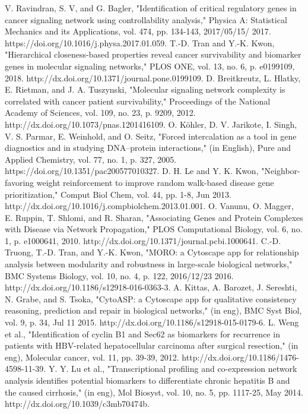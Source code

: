 \documentclass[5p,,preprint,12pt]{elsarticle}
\begin{document}
\begin{thebibliography}{71}
	V. Ravindran, S. V, and G. Bagler, "Identification of critical regulatory genes in cancer signaling network using controllability analysis," Physica A: Statistical Mechanics and its Applications, vol. 474, pp. 134-143, 2017/05/15/ 2017. https://doi.org/10.1016/j.physa.2017.01.059.
	T.-D. Tran and Y.-K. Kwon, "Hierarchical closeness-based properties reveal cancer survivability and biomarker genes in molecular signaling networks," PLOS ONE, vol. 13, no. 6, p. e0199109, 2018. http://dx.doi.org/10.1371/journal.pone.0199109.
	D. Breitkreutz, L. Hlatky, E. Rietman, and J. A. Tuszynski, "Molecular signaling network complexity is correlated with cancer patient survivability," Proceedings of the National Academy of Sciences, vol. 109, no. 23, p. 9209, 2012. http://dx.doi.org/10.1073/pnas.1201416109.
	O. Köhler, D. V. Jarikote, I. Singh, V. S. Parmar, E. Weinhold, and O. Seitz, "Forced intercalation as a tool in gene diagnostics and in studying DNA–protein interactions," (in English), Pure and Applied Chemistry, vol. 77, no. 1, p. 327, 2005.  https://doi.org/10.1351/pac200577010327.
	D. H. Le and Y. K. Kwon, "Neighbor-favoring weight reinforcement to improve random walk-based disease gene prioritization," Comput Biol Chem, vol. 44, pp. 1-8, Jun 2013. http://dx.doi.org/10.1016/j.compbiolchem.2013.01.001.
	O. Vanunu, O. Magger, E. Ruppin, T. Shlomi, and R. Sharan, "Associating Genes and Protein Complexes with Disease via Network Propagation," PLOS Computational Biology, vol. 6, no. 1, p. e1000641, 2010. http://dx.doi.org/10.1371/journal.pcbi.1000641.
	C.-D. Truong, T.-D. Tran, and Y.-K. Kwon, "MORO: a Cytoscape app for relationship analysis between modularity and robustness in large-scale biological networks," BMC Systems Biology, vol. 10, no. 4, p. 122, 2016/12/23 2016. http://dx.doi.org/10.1186/s12918-016-0363-3.
	A. Kittas, A. Barozet, J. Sereshti, N. Grabe, and S. Tsoka, "CytoASP: a Cytoscape app for qualitative consistency reasoning, prediction and repair in biological networks," (in eng), BMC Syst Biol, vol. 9, p. 34, Jul 11 2015. http://dx.doi.org/10.1186/s12918-015-0179-6.
	L. Weng et al., "Identification of cyclin B1 and Sec62 as biomarkers for recurrence in patients with HBV-related hepatocellular carcinoma after surgical resection," (in eng), Molecular cancer, vol. 11, pp. 39-39, 2012. http://dx.doi.org/10.1186/1476-4598-11-39.
	Y. Y. Lu et al., "Transcriptional profiling and co-expression network analysis identifies potential biomarkers to differentiate chronic hepatitis B and the caused cirrhosis," (in eng), Mol Biosyst, vol. 10, no. 5, pp. 1117-25, May 2014. http://dx.doi.org/10.1039/c3mb70474b.

\end{thebibliography}
\end{document}
